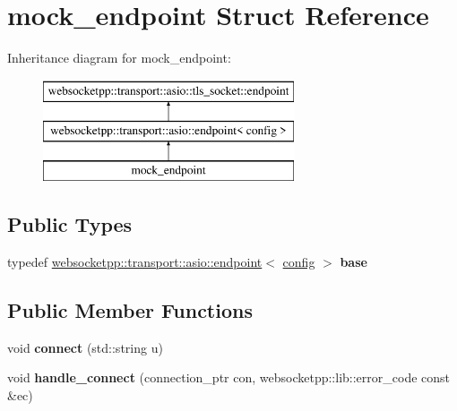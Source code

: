 \hypertarget{structmock__endpoint}{}\section{mock\+\_\+endpoint Struct Reference}
\label{structmock__endpoint}
Inheritance diagram for mock\+\_\+endpoint\+:\begin{figure}[H]
\begin{center}
\leavevmode
\includegraphics[height=3.000000cm]{structmock__endpoint}
\end{center}
\end{figure}
\subsection*{Public Types}
\begin{DoxyCompactItemize}
\item 
typedef \hyperlink{classwebsocketpp_1_1transport_1_1asio_1_1endpoint}{websocketpp\+::transport\+::asio\+::endpoint}$<$ \hyperlink{classconfig}{config} $>$ {\bfseries base}\hypertarget{structmock__endpoint_a4eebf98a5f794cd661c931b057644561}{}\label{structmock__endpoint_a4eebf98a5f794cd661c931b057644561}

\end{DoxyCompactItemize}
\subsection*{Public Member Functions}
\begin{DoxyCompactItemize}
\item 
void {\bfseries connect} (std\+::string u)\hypertarget{structmock__endpoint_acf190f7ee5faaae2599125bf9d8513af}{}\label{structmock__endpoint_acf190f7ee5faaae2599125bf9d8513af}

\item 
void {\bfseries handle\+\_\+connect} (connection\+\_\+ptr con, websocketpp\+::lib\+::error\+\_\+code const \&ec)\hypertarget{structmock__endpoint_a64fddd1db62bfe3fb324cd223c8165cd}{}\label{structmock__endpoint_a64fddd1db62bfe3fb324cd223c8165cd}

\end{DoxyCompactItemize}
